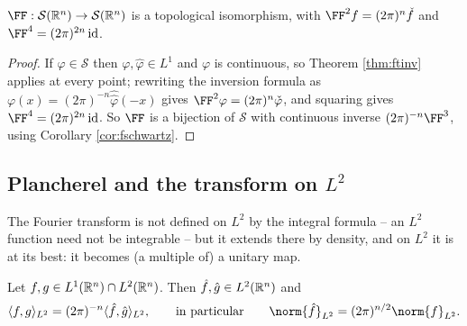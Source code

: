 \documentclass[a4paper]{scrartcl}
\newcommand{\ip}[2]{\langle #1, #2 \rangle}
\newcommand{\id}{\operatorname{id}}
\newcommand{\Sch}{\mathcal{S}}
\begin{document}
\begin{corollary}\label{cor:fsiso}
	$\FF : \Sch(\R^n)\to\Sch(\R^n)$ is a topological isomorphism, with $\FF^2 f = (2\pi)^n\check f$ and $\FF^4 = (2\pi)^{2n}\id$.
\end{corollary}

\begin{proof}
	If $\varphi \in \Sch$ then $\varphi, \hat\varphi \in L^1$ and $\varphi$ is continuous, so Theorem \ref{thm:ftinv} applies at every point; rewriting the inversion formula as $\varphi(x) = (2\pi)^{-n}\hat{\hat\varphi}(-x)$ gives $\FF^2\varphi = (2\pi)^n\check\varphi$, and squaring gives $\FF^4 = (2\pi)^{2n}\id$. So $\FF$ is a bijection of $\Sch$ with continuous inverse $(2\pi)^{-n}\FF^3$, using Corollary \ref{cor:fschwartz}.
\end{proof}

\subsection{Plancherel and the transform on \texorpdfstring{$L^2$}{L2}}

The Fourier transform is not defined on $L^2$ by the integral formula -- an $L^2$ function need not be integrable -- but it extends there by density, and on $L^2$ it is at its best: it becomes (a multiple of) a unitary map.

\begin{theorem}\label{aof-thm:plancherel}
	Let $f, g \in L^1(\mathbb{R}^n)\cap L^2(\mathbb{R}^n)$. Then $\hat f, \hat g \in L^2(\mathbb{R}^n)$ and
	$$\ip{f}{g}_{L^2} = (2\pi)^{-n}\ip{\hat f}{\hat g}_{L^2}, \qquad \text{in particular} \qquad \norm{\hat f}_{L^2}=(2\pi)^{n/2}\norm{f}_{L^2}.$$
\end{theorem}
\end{document}
